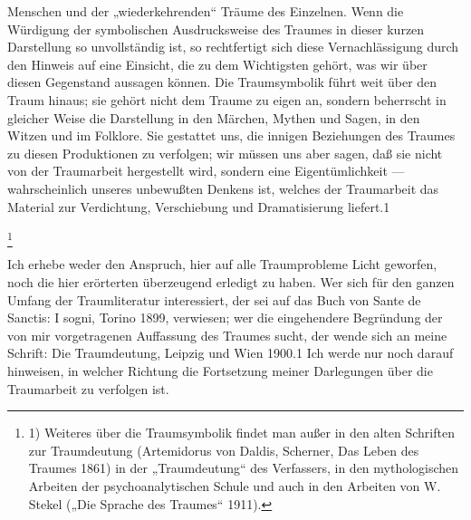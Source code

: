 \documentclass[twoside=true,titlepage=false,open=any, parskip=never, fontsize=10pt, headings=small, chapterprefix=false, appendixprefix=false]{scrbook}
\begin{document}
         
            
            
            
        \pstart
        Menschen und der „wiederkehrenden“ Träume des Einzelnen. Wenn die
               Würdigung der symbolischen Ausdrucksweise des Traumes in dieser kurzen
               Darstellung so unvollständig  ist, so rechtfertigt sich diese
               Vernachlässigung durch den Hinweis auf eine Einsicht, die zu dem
               Wichtigsten gehört, was wir über diesen Gegenstand aussagen können. Die
               Traumsymbolik führt weit über den Traum hinaus; sie gehört nicht dem Traume
               zu eigen an, sondern beherrscht in gleicher Weise die Darstellung in den
               Märchen, Mythen und Sagen, in den Witzen und im Folklore. Sie gestattet uns, die
               innigen Beziehungen des Traumes zu diesen Produktionen zu verfolgen; wir müssen
               uns aber sagen, daß sie nicht von der Traumarbeit hergestellt wird, sondern
               eine Eigentümlichkeit — wahrscheinlich unseres unbewußten Denkens
               ist, welches der Traumarbeit das Material zur Verdichtung, Verschiebung und
               Dramatisierung liefert.1
        \pend
    
            
        \footnote{1) Weiteres über die
               Traumsymbolik findet man außer in den alten Schriften zur Traumdeutung (Artemidorus von Daldis, Scherner, Das Leben des
               Traumes 1861) in der „Traumdeutung“ des Verfassers, in den mythologischen
               Arbeiten der psychoanalytischen Schule und auch in den Arbeiten von W. Stekel („Die Sprache des Traumes“ 1911).}
    
         
            
            
            \pstart{}\pend
            
        \pstart
        Ich erhebe weder den Anspruch, hier auf alle Traumprobleme Licht geworfen, noch
               die hier erörterten überzeugend erledigt zu haben. Wer sich für den ganzen
               Umfang der Traumliteratur interessiert, der sei auf das Buch von Sante de Sanctis:
               I sogni, Torino 1899, verwiesen; wer die eingehendere
                  Begründung der von mir vorgetragenen Auffassung des Traumes
               sucht, der wende sich an meine Schrift: Die
                  Traumdeutung, Leipzig und Wien 1900.1 Ich werde nur noch darauf hinweisen, in welcher Richtung die
               Fortsetzung meiner Darlegungen über die Traumarbeit zu verfolgen ist.
        \pend
    
\end{document}
